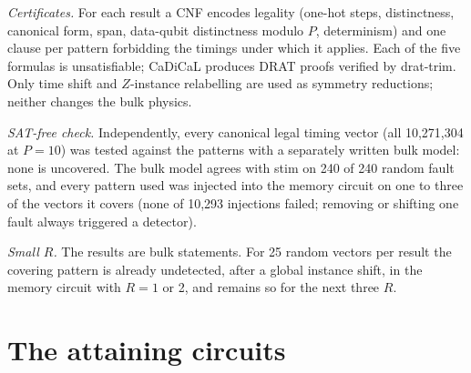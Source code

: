 \documentclass[aps,prl,twocolumn,superscriptaddress,nofootinbib]{revtex4-2}
\newif\ifshowclaimtags \showclaimtagsfalse
\newcommand{\cl}[1]{\ifshowclaimtags\textsuperscript{\textcolor{blue}{\scriptsize[#1]}}\fi}
\begin{document}
\emph{Certificates.} For each result a CNF encodes legality (one-hot steps, distinctness,
canonical form, span, data-qubit distinctness modulo $P$, determinism) and one clause per
pattern forbidding the timings under which it applies. Each of the five formulas is
unsatisfiable; CaDiCaL produces DRAT proofs verified by drat-trim. Only time shift and
$Z$-instance relabelling are used as symmetry reductions; neither changes the bulk physics.

\emph{SAT-free check.} Independently, every canonical legal timing vector (all 10,271,304
at $P=10$) was tested against the patterns with a separately written bulk model: none is
uncovered. The bulk model agrees with stim on 240 of 240 random fault sets, and every pattern
used was injected into the memory circuit on one to three of the vectors it covers (none of 10,293 injections
failed; removing or shifting one fault always triggered a detector).

\emph{Small $R$.} The results are bulk statements. For 25 random vectors per result the
covering pattern is already undetected, after a global instance shift, in the memory
circuit with $R=1$ or 2, and remains so for the next three $R$.

\section{The attaining circuits}\label{sm:attain}\cl{L-3,L-4,L-5,L-6,L-7,L-23}
\end{document}
